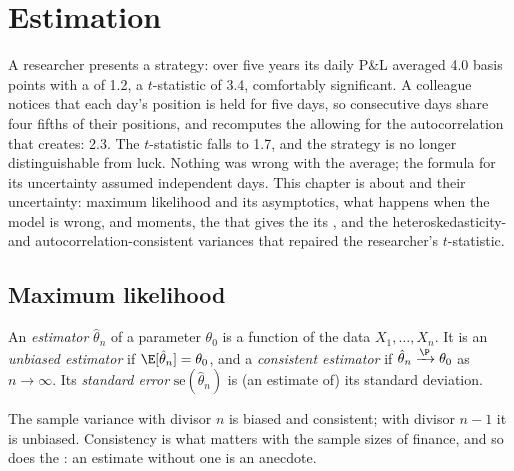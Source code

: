 \chapter{Estimation}\label{ch:qm:estimation}

A researcher presents a strategy: over five years its daily P\&L averaged 4.0 basis points with a
 of 1.2, a $t$-statistic of 3.4, comfortably significant. A colleague notices that
each day's position is held for five days, so consecutive days share four fifths of their
positions, and recomputes the  allowing for the autocorrelation that creates: 2.3.
The $t$-statistic falls to 1.7, and the strategy is no longer distinguishable from luck. Nothing
was wrong with the average; the formula for its uncertainty assumed independent days. This chapter
is about  and their uncertainty: maximum likelihood and its asymptotics, what happens
when the model is wrong,  and moments, the  that gives the  its
, and the heteroskedasticity- and autocorrelation-consistent variances that repaired
the researcher's $t$-statistic.

\section{Maximum likelihood}

\begin{definition}\label{def:qm:estimation:estimator}
An \emph{estimator} $\hat\theta_n$ of a parameter $\theta_0$ is a function of the data $X_1, \dots, X_n$. It is an
\emph{unbiased estimator} if $\E[\hat\theta_n] = \theta_0$, and a \emph{consistent
estimator} if $\hat\theta_n \xrightarrow{\P} \theta_0$ as $n \to \infty$. Its \emph{standard
error} $\mathrm{se}(\hat\theta_n)$ is (an estimate of) its standard deviation.
\end{definition}

The sample variance with divisor $n$ is biased and consistent; with divisor $n - 1$ it is unbiased. Consistency
is what matters with the sample sizes of finance, and so does the : an estimate without one is an
anecdote.

